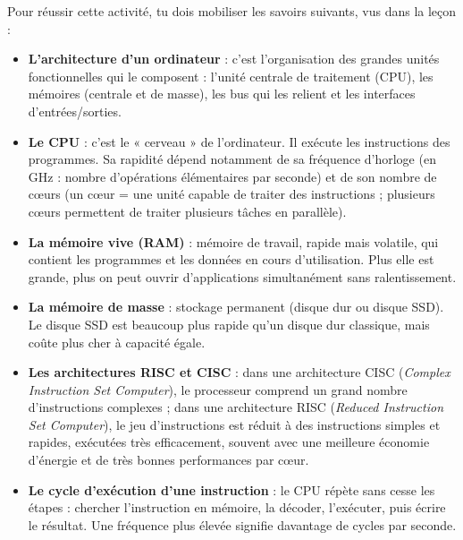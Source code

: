 \documentclass[11pt]{article}
\newcommand{\cle}[1]{{\popxbold\color{popdark}#1}}
\newcounter{popsec}
\newcounter{popsub}
\newcommand{\courssub}[1]{%
  \stepcounter{popsub}%
  \par\vspace{9pt}\noindent{\popxbold\fontsize{11.5}{13}\selectfont\color{popink}{\color{poporange}\thepopsec.\thepopsub}\hspace{6pt}#1}\par\nopagebreak\vspace{4pt}
}
\begin{document}
\courssub{Ressources à mobiliser}

Pour réussir cette activité, tu dois mobiliser les savoirs suivants, vus dans la leçon :

\begin{itemize}
\item \textbf{L'architecture d'un ordinateur} : c'est l'organisation des grandes unités fonctionnelles qui le composent : l'unité centrale de traitement (CPU), les mémoires (centrale et de masse), les bus qui les relient et les interfaces d'entrées/sorties.
\item \textbf{Le CPU} : c'est le « cerveau » de l'ordinateur. Il exécute les instructions des programmes. Sa rapidité dépend notamment de sa \cle{fréquence d'horloge} (en GHz : nombre d'opérations élémentaires par seconde) et de son \cle{nombre de cœurs} (un cœur = une unité capable de traiter des instructions ; plusieurs cœurs permettent de traiter plusieurs tâches en parallèle).
\item \textbf{La mémoire vive (RAM)} : mémoire de travail, rapide mais volatile, qui contient les programmes et les données en cours d'utilisation. Plus elle est grande, plus on peut ouvrir d'applications simultanément sans ralentissement.
\item \textbf{La mémoire de masse} : stockage permanent (disque dur ou disque SSD). Le disque \cle{SSD} est beaucoup plus rapide qu'un disque dur classique, mais coûte plus cher à capacité égale.
\item \textbf{Les architectures RISC et CISC} : dans une architecture \cle{CISC} (\emph{Complex Instruction Set Computer}), le processeur comprend un grand nombre d'instructions complexes ; dans une architecture \cle{RISC} (\emph{Reduced Instruction Set Computer}), le jeu d'instructions est réduit à des instructions simples et rapides, exécutées très efficacement, souvent avec une meilleure économie d'énergie et de très bonnes performances par cœur.
\item \textbf{Le cycle d'exécution d'une instruction} : le CPU répète sans cesse les étapes : chercher l'instruction en mémoire, la décoder, l'exécuter, puis écrire le résultat. Une fréquence plus élevée signifie davantage de cycles par seconde.
\end{itemize}
\end{document}
